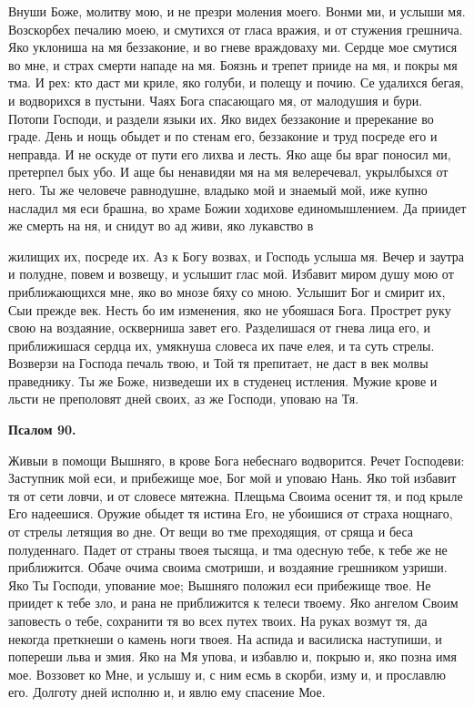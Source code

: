    Внуши Боже, молитву мою, и не презри моления моего. Вонми ми, и
услыши мя. Возскорбех печалию моею, и смутихся от гласа вражия, и от
стужения грешнича. Яко уклониша на мя беззаконие, и во гневе враждоваху
ми. Сердце мое смутися во мне, и страх смерти нападе на мя. Боязнь и
трепет прииде на мя, и покры мя тма. И рех: кто даст ми криле, яко голуби,
и полещу и почию. Се удалихся бегая, и водворихся в пустыни. Чаях Бога
спасающаго мя, от малодушия и бури. Потопи Господи, и раздели языки их.
Яко видех беззаконие и пререкание во граде. День и нощь обыдет и по
стенам его, беззаконие и труд посреде его и неправда. И не оскуде от пути
его лихва и лесть. Яко аще бы враг поносил ми, претерпел бых убо. И
аще бы ненавидяи мя на мя велеречевал, укрылбыхся от него. Ты
же человече равнодушне, владыко мой и знаемый мой, иже купно
насладил мя еси брашна, во храме Божии ходихове единомышлением.
Да приидет же смерть на ня, и снидут во ад живи, яко лукавство в

жилищих их, посреде их. Аз к Богу возвах, и Господь услыша мя.
Вечер и заутра и полудне, повем и возвещу, и услышит глас мой.
Избавит миром душу мою от приближающихся мне, яко во мнозе бяху
со мною. Услышит Бог и смирит их, Сыи прежде век. Несть бо им
изменения, яко не убояшася Бога. Прострет руку свою на воздаяние,
оскверниша завет его. Разделишася от гнева лица его, и приближишася
сердца их, умякнуша словеса их паче елея, и та суть стрелы. Возверзи
на Господа печаль твою, и Той тя препитает, не даст в век молвы
праведнику. Ты же Боже, низведеши их в студенец истления. Мужие
крове и льсти не преполовят дней своих, аз же Господи, уповаю на
Тя.



 

\bfseries Псалом 90.\normalfont{}


   Живыи в помощи Вышняго, в крове Бога небеснаго водворится. Речет
Господеви: Заступник мой еси, и прибежище мое, Бог мой и уповаю Нань.
Яко той избавит тя от сети ловчи, и от словесе мятежна. Плещьма Своима
осенит тя, и под крыле Его надеешися. Оружие обыдет тя истина Его, не
убоишися от страха нощнаго, от стрелы летящия во дне. От вещи во тме
преходящия, от сряща и беса полуденнаго. Падет от страны твоея тысяща, и
тма одесную тебе, к тебе же не приближится. Обаче очима своима смотриши,
и воздаяние грешником узриши. Яко Ты Господи, упование мое; Вышняго
положил еси прибежище твое. Не приидет к тебе зло, и рана не приближится
к телеси твоему. Яко ангелом Своим заповесть о тебе, сохранити тя
во всех путех твоих. На руках возмут тя, да некогда преткнеши о
камень ноги твоея. На аспида и василиска наступиши, и попереши
льва и змия. Яко на Мя упова, и избавлю и, покрыю и, яко позна
имя мое. Воззовет ко Мне, и услышу и, с ним есмь в скорби, изму
и, и прославлю его. Долготу дней исполню и, и явлю ему спасение
Мое.


